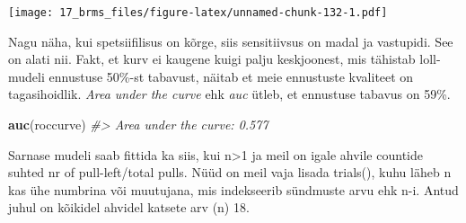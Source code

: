 \documentclass[]{book}
\newenvironment{Shaded}{\begin{snugshade}}{\end{snugshade}}
\newcommand{\CommentTok}[1]{\textcolor[rgb]{0.56,0.35,0.01}{\textit{#1}}}
\newcommand{\DataTypeTok}[1]{\textcolor[rgb]{0.13,0.29,0.53}{#1}}
\newcommand{\DecValTok}[1]{\textcolor[rgb]{0.00,0.00,0.81}{#1}}
\newcommand{\FloatTok}[1]{\textcolor[rgb]{0.00,0.00,0.81}{#1}}
\newcommand{\KeywordTok}[1]{\textcolor[rgb]{0.13,0.29,0.53}{\textbf{#1}}}
\newcommand{\NormalTok}[1]{#1}
\newcommand{\OperatorTok}[1]{\textcolor[rgb]{0.81,0.36,0.00}{\textbf{#1}}}
\newcommand{\StringTok}[1]{\textcolor[rgb]{0.31,0.60,0.02}{#1}}
\begin{document}
\begin{Shaded}
\end{Shaded}

\texttt{[image: 17\_brms\_files/figure-latex/unnamed-chunk-132-1.pdf]}

Nagu näha, kui spetsiifilisus on kõrge, siis sensitiivsus on madal ja vastupidi. See on alati nii. Fakt, et kurv ei kaugene kuigi palju keskjoonest, mis tähistab loll-mudeli ennustuse 50\%-st tabavust, näitab et meie ennustuste kvaliteet on tagasihoidlik. \emph{Area under the curve} ehk \emph{auc} ütleb, et ennustuse tabavus on 59\%.

\begin{Shaded}
\begin{Highlighting}[]
\KeywordTok{auc}\NormalTok{(roccurve)}
\CommentTok{#> Area under the curve: 0.577}
\end{Highlighting}
\end{Shaded}

Sarnase mudeli saab fittida ka siis, kui n\textgreater{}1 ja meil on igale ahvile countide suhted nr of pull-left/total pulls. Nüüd on meil vaja lisada trials(), kuhu läheb n kas ühe numbrina või muutujana, mis indekseerib sündmuste arvu ehk n-i. Antud juhul on kõikidel ahvidel katsete arv (n) 18.

\begin{Shaded}
\end{Shaded}
\end{document}
